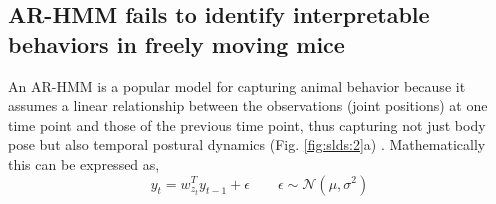 \subsection{AR-HMM fails to identify interpretable behaviors in freely moving mice}
\label{sec:slds:3.2.2}

An AR-HMM is a popular model for capturing animal behavior because it assumes a linear relationship between the observations (joint positions) at one time point and those of the previous time point, thus capturing not just body pose but also temporal postural dynamics (Fig. \ref{fig:slds:2}a) \cite{wiltschko_mapping_2015, datta_computational_2019, datta_q_2019}. Mathematically this can be expressed as,
\begin{equation} \label{eq:slds_1}
y_t = w_{z_t}^T y_{t-1} + \epsilon \qquad \epsilon \sim \mathcal{N}(\mu,\sigma^2)
\end{equation}

